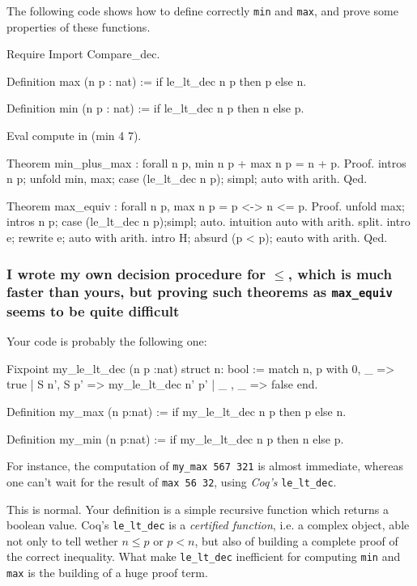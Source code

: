 \documentclass[a4paper,pdftex]{article}
\def\Question#1{\stepcounter{question}\subsubsection{#1}}
\begin{document}
The following code shows how to define correctly \texttt{min} and
\texttt{max}, and prove some properties of these functions.

\begin{coq_example}
Require Import Compare_dec.

Definition max (n p : nat) := if le_lt_dec n p then p else n.

Definition min (n p : nat) := if le_lt_dec n p then n else p.

Eval compute in (min 4 7).

Theorem min_plus_max : forall n p, min n p + max n p  = n + p.
Proof.
 intros n p; 
 unfold min, max; 
 case (le_lt_dec n p);
 simpl; auto with arith.
Qed.

Theorem max_equiv : forall n p, max n p = p <-> n <= p.
Proof.
 unfold max; intros n p; case (le_lt_dec n p);simpl; auto.
 intuition auto with arith.
 split. 
 intro e; rewrite e; auto with arith.
 intro H; absurd (p < p); eauto with arith.
Qed.
\end{coq_example}

\Question{I wrote my own decision procedure for $\leq$, which
is much  faster than yours, but proving such theorems as
 \texttt{max\_equiv} seems to be quite difficult}

Your code is probably the following one:

\begin{coq_example}
Fixpoint my_le_lt_dec (n p :nat) {struct n}: bool  :=
 match n, p with 0, _ => true
               | S n', S p' => my_le_lt_dec n' p'
               | _   , _    => false
 end.

Definition my_max (n p:nat) := if my_le_lt_dec n p then p else n.

Definition my_min (n p:nat) := if my_le_lt_dec n p then n else p.
\end{coq_example}


For instance, the computation of \texttt{my\_max 567 321} is almost
immediate, whereas one can't wait for  the result of 
\texttt{max 56 32}, using \emph{Coq's} \texttt{le\_lt\_dec}.

This is normal. Your definition is a simple recursive function which
returns a boolean value. Coq's \texttt{le\_lt\_dec} is a \emph{certified
function}, i.e. a complex object, able not only to tell wether $n\leq p$
or $p<n$, but also of building a complete proof of the correct inequality.
What make \texttt{le\_lt\_dec} inefficient for computing \texttt{min}
and \texttt{max} is the building of a huge proof term.
\end{document}

